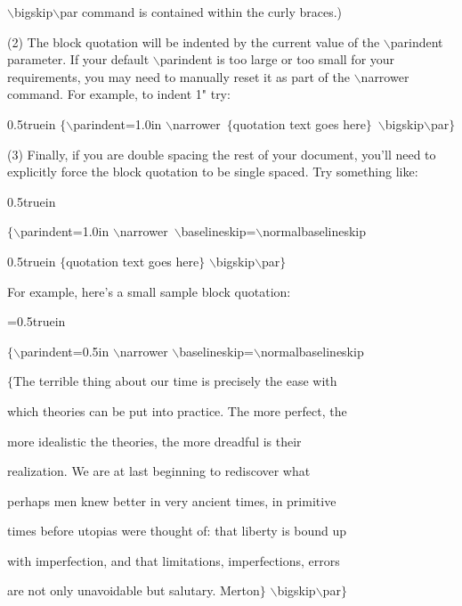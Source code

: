 {\twltt $\backslash$bigskip$\backslash$par} command is
contained within the curly braces.)
\bigskip\par\noindent 
(2) The block quotation will be indented by the current value of the
{\twltt $\backslash$parindent} parameter. If your default 
{\twltt $\backslash$parindent} is too large or too small for your
requirements, you may need to manually reset it as part of the 
{\twltt $\backslash$narrower} command. For example, to indent 1" try:
\bigskip\par\noindent\hglue 0.5truein
{\twltt $\{${}$\backslash$parindent=1.0in
$\backslash$narrower\ $\{${\twlit{}quotation text goes here}$\}$\  
$\backslash$bigskip$\backslash$par{}$\}$}
\bigskip\par\noindent
(3) Finally, if you are double spacing the rest of your document, you'll
need to explicitly force the block quotation to be single spaced.
Try something like:
\bigskip\par\noindent\hglue 0.5truein
{\twltt $\{${}$\backslash$parindent=1.0in
$\backslash$narrower\ $\backslash$baselineskip=$\backslash$normalbaselineskip
\par\noindent\hglue 0.5truein
$\{${\twlit{}quotation text goes here}$\}$
$\backslash$bigskip$\backslash$par{}$\}$}
\bigskip\par\noindent
For example, here's a small sample block quotation:
\bigskip\par\noindent
{\parindent=0.5truein\narrower
{\twltt$\{${}$\backslash$parindent=0.5in
$\backslash$narrower
$\backslash$baselineskip=$\backslash$normalbaselineskip
\par\noindent
{$\{$The terrible thing about our time is precisely the ease with
\par\noindent
which theories can be put into practice. The more perfect, the
\par\noindent
more idealistic the theories, the more dreadful is their
\par\noindent
realization. We are at last beginning to rediscover what 
\par\noindent
perhaps men knew better in very ancient times, in primitive
\par\noindent
times before utopias were thought of: that liberty is bound up
\par\noindent
with imperfection, and that limitations, imperfections, errors
\par\noindent
are not only unavoidable but salutary. Merton$\}$%
$\backslash$bigskip$\backslash$par{}$\}$}
\bigskip\par\noindent}}
